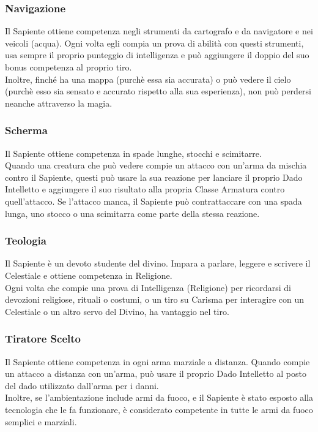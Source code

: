\subsubsection{Navigazione}
Il Sapiente ottiene competenza negli strumenti da cartografo e da navigatore e  nei veicoli (acqua). Ogni volta egli compia un prova di abilità con questi strumenti, usa sempre il proprio punteggio di intelligenza e può aggiungere il doppio del suo bonus competenza al proprio tiro.\\
Inoltre, finché ha una mappa (purchè essa sia accurata) o può vedere il cielo (purchè esso sia sensato e accurato rispetto alla sua esperienza), non può perdersi neanche attraverso la magia.

\subsubsection{Scherma}
Il Sapiente ottiene competenza in spade lunghe, stocchi e scimitarre.\\
Quando una creatura che può vedere compie un attacco con un'arma da mischia contro il Sapiente, questi può usare la sua reazione per lanciare il proprio Dado Intelletto e aggiungere il suo risultato alla propria Classe Armatura contro quell'attacco. Se l'attacco manca, il Sapiente può contrattaccare con una spada lunga, uno stocco o una scimitarra come parte della stessa reazione.

\subsubsection{Teologia}
Il Sapiente è un devoto studente del divino. Impara a parlare, leggere e scrivere il Celestiale e ottiene competenza in Religione.\\
Ogni volta che compie una prova di Intelligenza (Religione) per ricordarsi di devozioni religiose, rituali o costumi, o un tiro su Carisma per interagire con un Celestiale o un altro servo del Divino, ha vantaggio nel tiro.

\subsubsection{Tiratore Scelto}
Il Sapiente ottiene competenza in ogni arma marziale a distanza. Quando compie un attacco a distanza con un'arma, può usare il proprio Dado Intelletto al posto del dado utilizzato dall'arma per i danni.\\
Inoltre, se l'ambientazione include armi da fuoco, e il Sapiente è stato esposto alla tecnologia che le fa funzionare, è considerato competente in tutte le armi da fuoco semplici e marziali.

